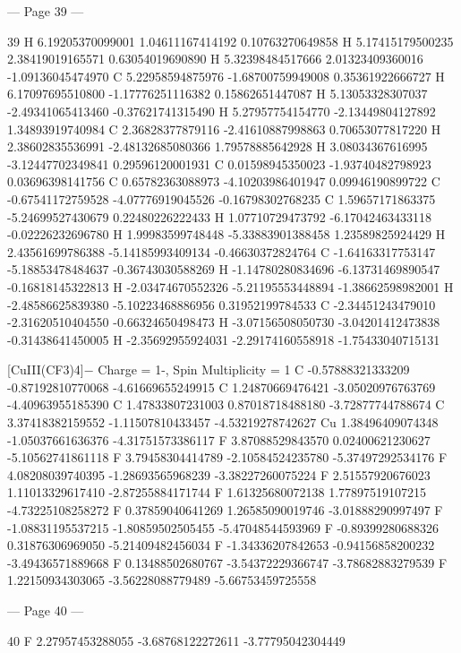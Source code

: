 \documentclass{article}
\begin{document}
--- Page 39 ---
 
39 
  H   6.19205370099001      1.04611167414192      0.10763270649858 
  H   5.17415179500235      2.38419019165571      0.63054019690890 
  H   5.32398484517666      2.01323409360016     -1.09136045474970 
  C   5.22958594875976     -1.68700759949008      0.35361922666727 
  H   6.17097695510800     -1.17776251116382      0.15862651447087 
  H   5.13053328307037     -2.49341065413460     -0.37621741315490 
  H   5.27957754154770     -2.13449804127892      1.34893919740984 
  C   2.36828377879116     -2.41610887998863      0.70653077817220 
  H   2.38602835536991     -2.48132685080366      1.79578885642928 
  H   3.08034367616995     -3.12447702349841      0.29596120001931 
  C   0.01598945350023     -1.93740482798923      0.03696398141756 
  C   0.65782363088973     -4.10203986401947      0.09946190899722 
  C   -0.67541172759528     -4.07776919045526     -0.16798302768235 
  C   1.59657171863375     -5.24699527430679      0.22480226222433 
  H   1.07710729473792     -6.17042463433118     -0.02226232696780 
  H   1.99983599748448     -5.33883901388458      1.23589825924429 
  H   2.43561699786388     -5.14185993409134     -0.46630372824764 
  C   -1.64163317753147     -5.18853478484637     -0.36743030588269 
  H   -1.14780280834696     -6.13731469890547     -0.16818145322813 
  H   -2.03474670552326     -5.21195553448894     -1.38662598982001 
  H   -2.48586625839380     -5.10223468886956      0.31952199784533 
  C   -2.34451243479010     -2.31620510404550     -0.66324650498473 
  H   -3.07156508050730     -3.04201412473838     -0.31438641450005 
  H   -2.35692955924031     -2.29174160558918     -1.75433040715131 
 
[CuIII(CF3)4]− 
Charge = 1-, Spin Multiplicity = 1 
  C   -0.57888321333209     -0.87192810770068     -4.61669655249915 
  C   1.24870669476421     -3.05020976763769     -4.40963955185390 
  C   1.47833807231003      0.87018718488180     -3.72877744788674 
  C   3.37418382159552     -1.11507810433457     -4.53219278742627 
  Cu  1.38496409074348     -1.05037661636376     -4.31751573386117 
  F   3.87088529843570      0.02400621230627     -5.10562741861118 
  F   3.79458304414789     -2.10584524235780     -5.37497292534176 
  F   4.08208039740395     -1.28693565968239     -3.38227260075224 
  F   2.51557920676023      1.11013329617410     -2.87255884171744 
  F   1.61325680072138      1.77897519107215     -4.73225108258272 
  F   0.37859040641269      1.26585090019746     -3.01888290997497 
  F   -1.08831195537215     -1.80859502505455     -5.47048544593969 
  F   -0.89399280688326      0.31876306969050     -5.21409482456034 
  F   -1.34336207842653     -0.94156858200232     -3.49436571889668 
  F   0.13488502680767     -3.54372229366747     -3.78682883279539 
  F   1.22150934303065     -3.56228088779489     -5.66753459725558 


--- Page 40 ---
 
40 
  F   2.27957453288055     -3.68768122272611     -3.77795042304449 
\newpage
\end{document}
